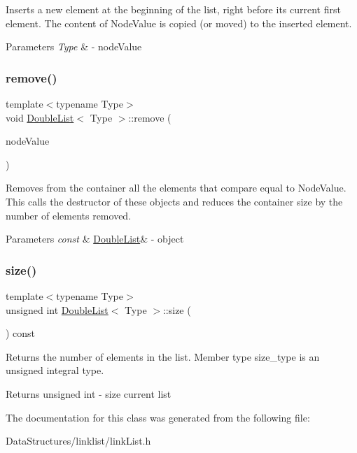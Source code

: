 Inserts a new element at the beginning of the list, right before its current first element. The content of Node\+Value is copied (or moved) to the inserted element. 


\begin{DoxyParams}{Parameters}
{\em Type} & -\/ node\+Value \\
\hline
\end{DoxyParams}
\mbox{\label{classDoubleList_a58263ddfc70173f0d5a58c7e4af0e0f1}} 
\subsubsection{\texorpdfstring{remove()}{remove()}}
{\footnotesize\ttfamily template$<$typename Type$>$ \\
void \hyperlink{classDoubleList}{Double\+List}$<$ Type $>$\+::remove (\begin{DoxyParamCaption}\item[{const Type \&}]{node\+Value }\end{DoxyParamCaption})}



Removes from the container all the elements that compare equal to Node\+Value. This calls the destructor of these objects and reduces the container size by the number of elements removed. 


\begin{DoxyParams}{Parameters}
{\em const} & \hyperlink{classDoubleList}{Double\+List}\& -\/ object \\
\hline
\end{DoxyParams}
\mbox{\label{classDoubleList_a4d41e1e9987abfacc315bbce462618c2}} 
\subsubsection{\texorpdfstring{size()}{size()}}
{\footnotesize\ttfamily template$<$typename Type$>$ \\
unsigned int \hyperlink{classDoubleList}{Double\+List}$<$ Type $>$\+::size (\begin{DoxyParamCaption}\item[{void}]{ }\end{DoxyParamCaption}) const}



Returns the number of elements in the list. Member type size\+\_\+type is an unsigned integral type. 

\begin{DoxyReturn}{Returns}
unsigned int -\/ size current list 
\end{DoxyReturn}


The documentation for this class was generated from the following file\+:\begin{DoxyCompactItemize}
\item 
Data\+Structures/linklist/link\+List.\+h\end{DoxyCompactItemize}
